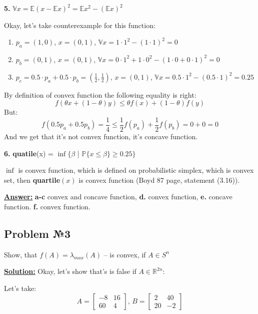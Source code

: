 \textbf{5.} $\mathds{V} x = \mathds{E} (x-\mathds{E}x)^2 = \mathds{E}x^2 - \left( \mathds{E} x\right)^2$

Okay, let's take counterexample for this function:
\begin{enumerate}
    \item  $p_a = (1, 0)$, $x = (0, 1)$, $\mathds{V}x = 1 \cdot 1^2 - (1 \cdot 1)^2 = 0$

    \item $p_b = (0, 1)$, $x = (0, 1)$, $\mathds{V}x = 0 \cdot 1^2 + 1 \cdot 0^2 - (1 \cdot 0 + 0 \cdot 1)^2 = 0$

    \item $p_c = 0.5\cdot p_a + 0.5 \cdot p_b = (\frac{1}{2}, \frac{1}{2})$, $x = (0, 1)$,
    $\mathds{V}x = 0.5 \cdot 1^2 - (0.5 \cdot 1)^2 = 0.25$
\end{enumerate}

By definition of convex function the following equality is right:
\newline
\begin{equation*}
f(\theta x + (1-\theta)y ) \leq \theta f(x) + (1-\theta) f(y)    
\end{equation*}
But:
\begin{equation*}
    f(0.5p_a + 0.5p_b)=\frac{1}{4} \leq \frac{1}{2}f(p_a) + \frac{1}{2}f(p_b) = 0 + 0 = 0
\end{equation*}
And we get that it's not convex function, it's concave function.

\textbf{6.} \textbf{quatile}(x) = $\inf \{ \beta$ | $\mathds{P} \{x \leq \beta \} \geq 0.25\}$ 

$\inf$ is convex function, which is defined on probabilistic simplex, which is convex set, then \textbf{quartile}$(x)$ is convex function (Boyd 87 page, statement (3.16)).

\underline{\textbf{Answer:}}
\textbf{a-c} convex and concave function,  \textbf{d.} convex function, \textbf{e.} 
concave function. \textbf{f.} convex function.

\subsection{Problem №3}
Show, that $f(A) = \lambda_{max}(A)$ -- is convex, if $A \in S^n$

\underline{\textbf{Solution:}}
Okay, let's show that's is false if $A \in \mathds{R}^{2n}$:

Let's take: 
\begin{equation*}
    A = \begin{bmatrix}
    -8 & 16 \\
    60 & 4 
\end{bmatrix} \text{, }     B = \begin{bmatrix}
    2 & 40 \\
    20 & -2
\end{bmatrix}
\end{equation*}

